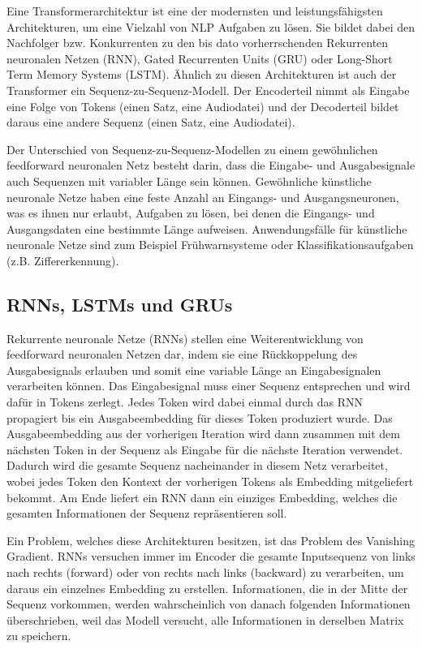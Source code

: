 Eine Transformerarchitektur ist eine der modernsten und leistungsfähigsten Architekturen, um eine Vielzahl von  NLP Aufgaben zu lösen. 
Sie bildet dabei den Nachfolger bzw. Konkurrenten zu den bis dato vorherrschenden Rekurrenten neuronalen Netzen (RNN), Gated Recurrenten Units (GRU) oder Long-Short Term Memory Systems (LSTM). 
Ähnlich zu diesen Architekturen ist auch der Transformer ein Sequenz-zu-Sequenz-Modell. 
Der Encoderteil nimmt als Eingabe eine Folge von Tokens (einen Satz, eine Audiodatei) und der Decoderteil bildet daraus eine andere Sequenz (einen Satz, eine Audiodatei). 

Der Unterschied von Sequenz-zu-Sequenz-Modellen zu einem gewöhnlichen feedforward neuronalen Netz besteht darin, dass die Eingabe- und Ausgabesignale auch Sequenzen mit variabler Länge sein können.
Gewöhnliche künstliche neuronale Netze haben eine feste Anzahl an Eingangs- und Ausgangsneuronen, was es ihnen nur erlaubt, Aufgaben zu lösen, bei denen die Eingangs- und Ausgangsdaten eine bestimmte Länge aufweisen.
Anwendungsfälle für künstliche neuronale Netze sind zum Beispiel Frühwarnsysteme oder Klassifikationsaufgaben (z.B. Ziffererkennung).

\subsection{RNNs, LSTMs und GRUs}

Rekurrente neuronale Netze (RNNs) stellen eine Weiterentwicklung von feedforward neuronalen Netzen dar, indem sie eine Rückkoppelung des Ausgabesignals erlauben und somit eine variable Länge an Eingabesignalen verarbeiten können.
Das Eingabesignal muss einer Sequenz entsprechen und wird dafür in Tokens zerlegt.
Jedes Token wird dabei einmal durch das RNN propagiert bis ein Ausgabeembedding für dieses Token produziert wurde.
Das Ausgabeembedding aus der vorherigen Iteration wird dann zusammen mit dem nächsten Token in der Sequenz als Eingabe für die nächste Iteration verwendet.
Dadurch wird die gesamte Sequenz nacheinander in diesem Netz verarbeitet, wobei jedes Token den Kontext der vorherigen Tokens als Embedding mitgeliefert bekommt.
Am Ende liefert ein RNN dann ein einziges Embedding, welches die gesamten Informationen der Sequenz repräsentieren soll.

Ein Problem, welches diese Architekturen besitzen, ist das Problem des Vanishing Gradient.
RNNs versuchen immer im Encoder die gesamte Inputsequenz von links nach rechts (forward) oder von rechts nach links (backward) zu verarbeiten, um daraus ein einzelnes Embedding zu erstellen.
Informationen, die in der Mitte der Sequenz vorkommen, werden wahrscheinlich von danach folgenden Informationen überschrieben, weil das Modell versucht, alle Informationen in derselben Matrix zu speichern. 

